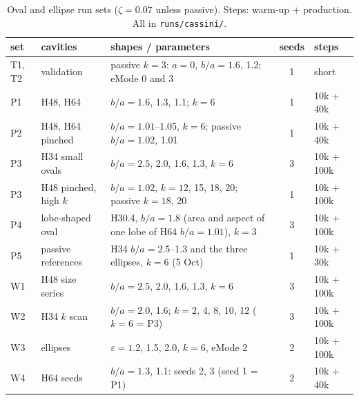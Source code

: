 \begin{table}[H]\centering\small
\caption{Oval and ellipse run sets ($\zeta=0.07$ unless passive). Steps: warm-up + production. All in \texttt{runs/cassini/}.}\label{tab:ssets}
\begin{tabularx}{\textwidth}{llXcl}\toprule
set & cavities & shapes / parameters & seeds & steps\\\midrule
T1, T2 & validation & passive $k=3$: $a=0$, $b/a=1.6$, 1.2; eMode 0 and 3 & 1 & short\\
P1 & H48, H64 & $b/a=1.6$, 1.3, 1.1; $k=6$ & 1 & 10k + 40k\\
P2 & H48, H64 pinched & $b/a=1.01$--1.05, $k=6$; passive $b/a=1.02$, 1.01 & 1 & 10k + 40k\\
P3 & H34 small ovals & $b/a=2.5$, 2.0, 1.6, 1.3, $k=6$ & 3 & 10k + 100k\\
P3 & H48 pinched, high $k$ & $b/a=1.02$, $k=12$, 15, 18, 20; passive $k=18$, 20 & 1 & 10k + 100k\\
P4 & lobe-shaped oval & H30.4, $b/a=1.8$ (area and aspect of one lobe of H64 $b/a=1.01$), $k=3$ & 3 & 10k + 100k\\
P5 & passive references & H34 $b/a=2.5$--1.3 and the three ellipses, $k=6$ (5 Oct) & 1 & 10k + 30k\\
W1 & H48 size series & $b/a=2.5$, 2.0, 1.6, 1.3, $k=6$ & 3 & 10k + 100k\\
W2 & H34 $k$ scan & $b/a=2.0$, 1.6; $k=2$, 4, 8, 10, 12 ($k=6$ = P3) & 3 & 10k + 100k\\
W3 & ellipses & $\varepsilon=1.2$, 1.5, 2.0, $k=6$, eMode 2 & 2 & 10k + 100k\\
W4 & H64 seeds & $b/a=1.3$, 1.1: seeds 2, 3 (seed 1 = P1) & 2 & 10k + 40k\\\bottomrule
\end{tabularx}
\end{table}

